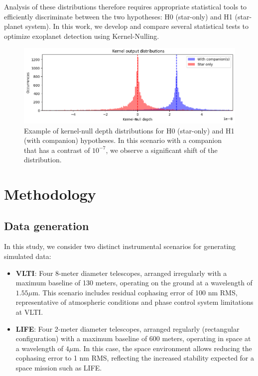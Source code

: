 \documentclass{article}
\begin{document}
Analysis of these distributions therefore requires appropriate statistical tools to efficiently discriminate between the two hypotheses: H0 (star-only) and H1 (star-planet system). In this work, we develop and compare several statistical tests to optimize exoplanet detection using Kernel-Nulling.

\begin{figure}[H]
\centering
\includegraphics[width=\linewidth]{img/output_distribution.png}
\caption{Example of kernel-null depth distributions for H0 (star-only) and H1 (with companion) hypotheses. In this scenario with a companion that has a contrast of $10^{-7}$, we observe a significant shift of the distribution.}
\label{fig:distribution}
\end{figure}


\section{Methodology}

\subsection{Data generation}

In this study, we consider two distinct instrumental scenarios for generating simulated data:

\begin{itemize}
    \item \textbf{VLTI}: Four 8-meter diameter telescopes, arranged irregularly with a maximum baseline of 130 meters, operating on the ground at a wavelength of $1.55\mu$m. This scenario includes residual cophasing error of 100 nm RMS, representative of atmospheric conditions and phase control system limitations at VLTI.
    \item \textbf{LIFE}: Four 2-meter diameter telescopes, arranged regularly (rectangular configuration) with a maximum baseline of 600 meters, operating in space at a wavelength of $4\mu$m. In this case, the space environment allows reducing the cophasing error to 1 nm RMS, reflecting the increased stability expected for a space mission such as LIFE.
\end{itemize}
\end{document}
